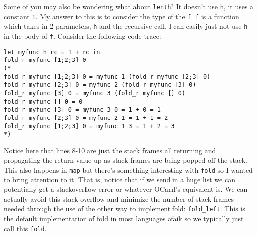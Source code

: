\documentclass[main.tex]{subfiles}
\begin{document}
Some of you may also be wondering what about \texttt{lenth}? It doesn't use \texttt{h}, it uses a constant \texttt{1}. 
My answer to this is to consider the type of the \texttt{f}. \texttt{f} is a function which takes in 2 parameters, \texttt{h} and the recursive call. I can easily just not use \texttt{h} in the body of \texttt{f}. Consider the following code trace:
\begin{lstlisting}[style=Myocamlstyle]
let myfunc h rc = 1 + rc in 
fold_r myfunc [1;2;3] 0
(*
fold_r myfunc [1;2;3] 0 = myfunc 1 (fold_r myfunc [2;3] 0)
fold_r myfunc [2;3] 0 = myfunc 2 (fold_r myfunc [3] 0)
fold_r myfunc [3] 0 = myfunc 3 (fold_r myfunc [] 0)
fold_r myfunc [] 0 = 0
fold_r myfunc [3] 0 = myfunc 3 0 = 1 + 0 = 1
fold_r myfunc [2;3] 0 = myfunc 2 1 = 1 + 1 = 2
fold_r myfunc [1;2;3] 0 = myfunc 1 3 = 1 + 2 = 3
*)
\end{lstlisting}
Notice here that lines 8-10 are just the stack frames all returning and propagating the return value up as stack frames are being popped off the stack. This also happens in \texttt{map} but there's something interesting with \texttt{fold} so I wanted to bring attention to it. That is, notice that if we send in a huge list we can potentially get a stackoverflow error or whatever OCaml's equivalent is. 
We can actually avoid this stack overflow and minimize the number of stack frames needed through the use of the other way to implement fold: \texttt{fold\_left}. This is the default implementation of fold in most languages afaik so we typically just call this \texttt{fold}. 
\end{document}
